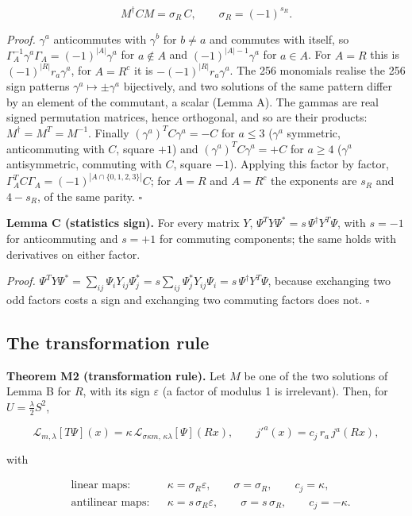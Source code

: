 \documentclass[11pt]{article}
\begin{document}
\[
M^\dagger CM=\sigma_R\,C,\qquad \sigma_R=(-1)^{s_R}.
\]

\emph{Proof.} $\gamma^a$ anticommutes with $\gamma^b$ for $b\ne a$ and commutes with itself, so $\Gamma_A^{-1}\gamma^a\Gamma_A=(-1)^{|A|}\gamma^a$ for $a\notin A$ and $(-1)^{|A|-1}\gamma^a$ for $a\in A$. For $A=R$ this is $(-1)^{|R|}r_a\gamma^a$, for $A=R^c$ it is $-(-1)^{|R|}r_a\gamma^a$. The 256 monomials realise the 256 sign patterns $\gamma^a\mapsto\pm\gamma^a$ bijectively, and two solutions of the same pattern differ by an element of the commutant, a scalar (Lemma A). The gammas are real signed permutation matrices, hence orthogonal, and so are their products: $M^\dagger=M^T=M^{-1}$. Finally $(\gamma^a)^TC\gamma^a=-C$ for $a\le3$ ($\gamma^a$ symmetric, anticommuting with $C$, square $+1$) and $(\gamma^a)^TC\gamma^a=+C$ for $a\ge4$ ($\gamma^a$ antisymmetric, commuting with $C$, square $-1$). Applying this factor by factor, $\Gamma_A^TC\Gamma_A=(-1)^{|A\cap\{0,1,2,3\}|}C$; for $A=R$ and $A=R^c$ the exponents are $s_R$ and $4-s_R$, of the same parity. $\square$

\textbf{Lemma C (statistics sign).} For every matrix $Y$, $\Psi^TY\Psi^\ast=s\,\Psi^\dagger Y^T\Psi$, with $s=-1$ for anticommuting and $s=+1$ for commuting components; the same holds with derivatives on either factor.

\emph{Proof.} $\Psi^TY\Psi^\ast=\sum_{ij}\Psi_iY_{ij}\Psi^\ast_j=s\sum_{ij}\Psi^\ast_jY_{ij}\Psi_i=s\,\Psi^\dagger Y^T\Psi$, because exchanging two odd factors costs a sign and exchanging two commuting factors does not. $\square$

\subsection{The transformation rule}

\textbf{Theorem M2 (transformation rule).} Let $M$ be one of the two solutions of Lemma B for $R$, with its sign $\varepsilon$ (a factor of modulus 1 is irrelevant). Then, for $U=\tfrac\lambda2S^2$,

\[
\mathcal L_{m,\lambda}[T\Psi](x)=\kappa\,\mathcal L_{\sigma\kappa m,\,\kappa\lambda}[\Psi](Rx),\qquad j'^a(x)=c_j\,r_a\,j^a(Rx),
\]

with

\[
\begin{aligned}
&\text{linear maps:}&&\kappa=\sigma_R\varepsilon,\qquad \sigma=\sigma_R,\qquad c_j=\kappa,\\
&\text{antilinear maps:}&&\kappa=s\,\sigma_R\varepsilon,\qquad \sigma=s\,\sigma_R,\qquad c_j=-\kappa .
\end{aligned}
\]
\end{document}
